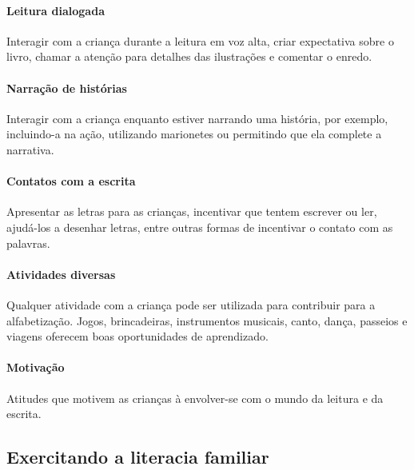 \documentclass[11pt]{extarticle}
\begin{document}
\paragraph{Leitura dialogada} Interagir com a criança durante a leitura 
em voz alta, criar expectativa sobre o livro, chamar a atenção para detalhes 
das ilustrações e comentar o enredo.

\paragraph{Narração de histórias} Interagir com a criança enquanto 
estiver narrando uma história, por exemplo, incluindo-a na ação, utilizando 
marionetes ou permitindo que ela complete a narrativa.

\paragraph{Contatos com a escrita} Apresentar as letras para as 
crianças, incentivar que tentem escrever ou ler, ajudá-los a desenhar letras, 
entre outras formas de incentivar o contato com as palavras.

\paragraph{Atividades diversas} Qualquer atividade com a criança 
pode ser utilizada para contribuir para a alfabetização. Jogos, brincadeiras, 
instrumentos musicais, canto, dança, passeios e viagens oferecem boas 
oportunidades de aprendizado.

\paragraph{Motivação} Atitudes que motivem as crianças à envolver-se com 
o mundo da leitura e da escrita.

\subsection{Exercitando a literacia familiar}

\end{document}
